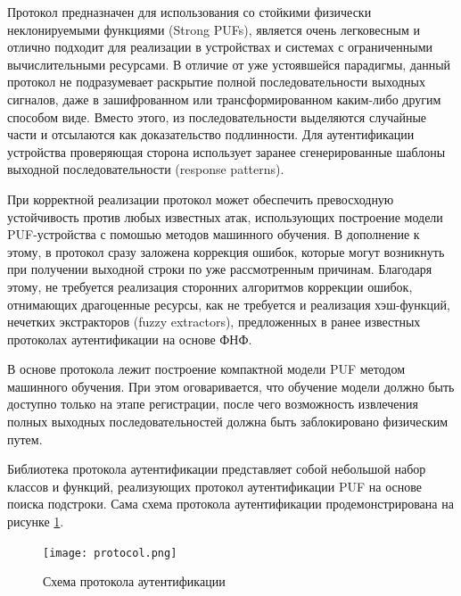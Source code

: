 Протокол предназначен для использования со стойкими физически неклонируемыми функциями (Strong PUFs), является очень легковесным и отлично подходит для реализации в устройствах и системах с ограниченными вычислительными ресурсами. В отличие от уже устоявшейся парадигмы, данный протокол не подразумевает раскрытие полной последовательности выходных сигналов, даже в зашифрованном или трансформированном каким-либо другим способом виде. Вместо этого, из последовательности выделяются случайные части и отсылаются как доказательство подлинности. Для аутентификации устройства проверяющая сторона использует заранее сгенерированные шаблоны выходной последовательности (response patterns).

При корректной реализации протокол может обеспечить превосходную устойчивость против любых известных атак, использующих построение модели PUF-устройства с помошью методов машинного обучения. В дополнение к этому, в протокол сразу заложена коррекция ошибок, которые могут возникнуть при получении выходной строки по уже рассмотренным причинам. Благодаря этому, не требуется реализация сторонних алгоритмов коррекции ошибок, отнимающих драгоценные ресурсы, как не требуется и реализация хэш-функций, нечетких экстракторов (fuzzy extractors), предложенных в ранее известных протоколах аутентификации на основе ФНФ.

В основе протокола лежит построение компактной модели PUF методом машинного обучения. При этом оговаривается, что обучение модели должно быть доступно только на этапе регистрации, после чего возможность извлечения полных выходных последовательностей должна быть заблокировано физическим путем.

Библиотека протокола аутентификации представляет собой небольшой набор классов и функций, реализующих протокол аутентификации PUF на основе поиска подстроки. Сама схема протокола аутентификации продемонстрирована на рисунке \ref{fig:architecture:protocol}.

\begin{figure}[!h]
    \centering
    \texttt{[image: protocol.png]}
    \caption{Схема протокола аутентификации}
    \label{fig:architecture:protocol}
\end{figure}

